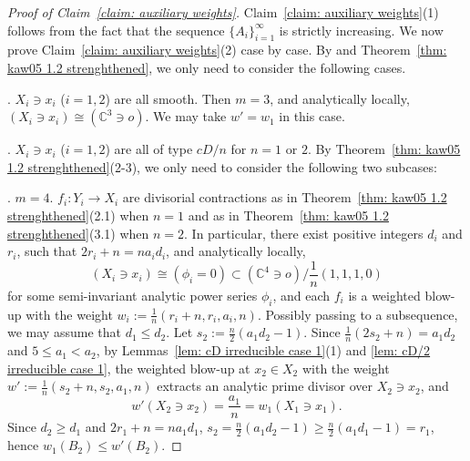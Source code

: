 \documentclass[11pt]{amsart}
\numberwithin{equation}{section}
\theoremstyle{definition}
\theoremstyle{definition}
\begin{document}
\begin{proof}[Proof of Claim~\ref{claim: auxiliary weights}] Claim~\ref{claim: auxiliary weights}(1) follows from the fact that the sequence $\{A_i\}_{i=1}^{\infty}$ is strictly increasing. We now prove Claim~\ref{claim: auxiliary weights}(2) case by case. By \cite[Theorem~1.1]{Kaw01} and Theorem~\ref{thm: kaw05 1.2 strenghthened}, we only need to consider the following cases. 
\medskip

. $X_i\ni x_i$ ($i=1,2$) are all smooth. Then $m=3$, and analytically locally, $(X_i\ni x_i)\cong (\mathbb{C}^3\ni o)$. We may take $w'=w_1$ in this case.

\medskip

. $X_i\ni x_i$ ($i=1,2$) are all of type $cD/n$ for $n=1$ or $2$. By Theorem~\ref{thm: kaw05 1.2 strenghthened}(2-3), we only need to consider the following two subcases:

\medskip

. $m=4$. $f_i: Y_i\to X_i$ are divisorial contractions as in Theorem~\ref{thm: kaw05 1.2 strenghthened}(2.1) when $n=1$ and as in Theorem~\ref{thm: kaw05 1.2 strenghthened}(3.1) when $n=2$. In particular, there exist positive integers $d_i$ and $r_i$, such that  $2r_i+n=na_id_i$, and analytically locally, $$(X_i\ni x_i)\cong (\phi_i=0)\subset (\mathbb{C}^4\ni o)/\frac{1}{n}(1,1,1,0)$$ for some semi-invariant analytic power series $\phi_i$, and each $f_i$ is a weighted blow-up with the weight $w_i:=\frac{1}{n}(r_i+n,r_i,a_i,n)$. Possibly passing to a subsequence, we may assume that $d_1\leq d_2$. Let $s_2:=\frac{n}{2}(a_1d_2-1)$. Since $\frac{1}{n}(2s_2+n)=a_1d_2$ and $5\leq a_1< a_2$, by Lemmas~\ref{lem: cD irreducible case 1}(1) and \ref{lem: cD/2 irreducible case 1}, the weighted blow-up at $x_2\in X_2$ with the weight $ w':=\frac{1}{n}(s_2+n,s_2,a_1,n)$ extracts an analytic prime divisor over $X_2\ni x_2$, and $$w'(X_2\ni x_2)=\frac{a_1}{n}=w_1(X_1\ni x_1).$$ Since $d_2\geq d_1$ and $2r_1+n=na_1d_1$, $s_2=\frac{n}{2}(a_1d_2-1)\geq \frac{n}{2}(a_1d_1-1)= r_1$, hence $w_1(B_2)\leq w'(B_2)$.

\medskip


\end{proof}
\end{document}
